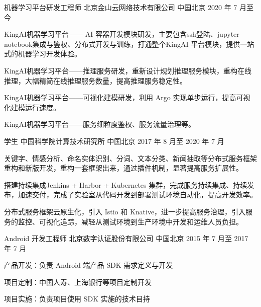 

\begin{cventries}

\cventry
{机器学习平台研发工程师} %
{北京金山云网络技术有限公司} %
{中国北京} %
{2020 年 7 月至今} %
{
  \begin{cvitems} %
    \item KingAI机器学习平台—— AI 容器开发模块研发，主要包含ssh登陆、jupyter notebook集成与鉴权、分布式开发与训练，打通整个KingAI
    平台模块，提供一站式的机器学习开发体验。
    \item KingAI机器学习平台——推理服务研发，重新设计规划推理服务模块，重构在线推理，大幅精简在线推理服务数量，提高推理服务稳定性。
    \item KingAI机器学习平台——可视化建模研发，利用 Argo 实现单步运行，提高可视化建模运行速度。
    \item KingAI机器学习平台——服务细粒度鉴权、服务流量治理等。
  \end{cvitems}
}

  \cventry
    {学生} %
    {中国科学院计算技术研究所} %
    {中国北京} %
    {2017 年 8 月至 2020 年 7 月} %
    {
      \begin{cvitems} %
        \item 关键字、情感分析、命名实体识别、分词、文本分类、新闻抽取等分布式服务框架重构和新版开发，重构一套框架出来，通过插件机制，显著提高服务扩展性。
        \item 搭建持续集成Jenkins + Harbor + Kubernetes 集群，完成服务持续集成、持续发布，加速交付，完成了实验室从代码开发到部署测试环境自动化，提高开发效率。
        \item 分布式服务框架云原生化，引入 Istio 和 Knative，进一步提高服务治理，引入服务的监控、可视化追踪，减轻从测试环境到生产环境中开发和运维人员负担。
      \end{cvitems}
    }

  \cventry
    {Android 开发工程师} %
    {北京数字认证股份有限公司} %
    {中国北京} %
    {2015 年 7 月至 2017 年 7 月} %
    {
      \begin{cvitems} %
        \item 产品开发：负责 Android 端产品 SDK 需求定义与开发
        \item 项目定制：中国人寿、上海银行等项目定制开发
        \item 项目实施：负责项目使用 SDK 实施的技术目持
      \end{cvitems}
    }

\end{cventries}

